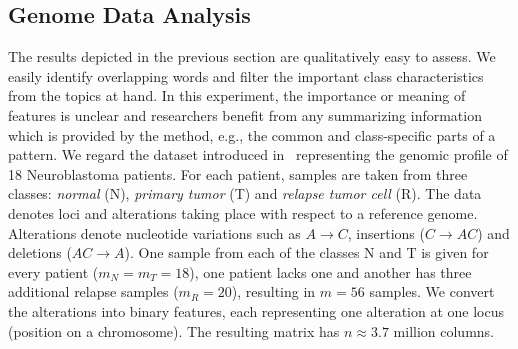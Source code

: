 \subsection{Genome Data Analysis}\label{sec:CS:gene}
The results depicted in the previous section are qualitatively easy to assess. We easily identify overlapping words and filter the important class characteristics from the topics at hand. 
In this experiment, the importance or meaning of features is unclear and researchers benefit from any summarizing information which is provided by the method, e.g., the common and class-specific parts of a pattern.
We regard the dataset introduced in~\cite{schramm2015mutational} representing the genomic profile of 18 Neuroblastoma patients. For each patient, samples are taken from three classes: \emph{normal} (N), \emph{primary tumor} (T) and \emph{relapse tumor  cell} (R). The data denotes loci and alterations taking place with respect to a reference genome. Alterations denote nucleotide variations such as $A\rightarrow C$, insertions ($C\rightarrow AC$) and deletions ($AC\rightarrow A$). One sample from each of the classes N and T is given for every patient ($m_N=m_T=18$), one patient lacks one and another has three additional relapse samples ($m_R=20$), resulting in $m=56$ samples.   
We convert the alterations into binary features, each representing one alteration at one locus (position on a chromosome). The resulting matrix has $n\approx 3.7$ million columns.
